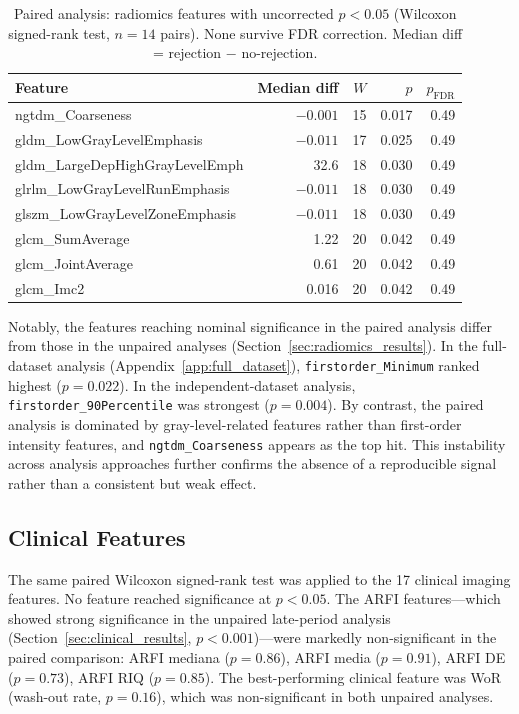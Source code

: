 \begin{table}[ht]
\centering
\caption{Paired analysis: radiomics features with uncorrected $p < 0.05$ (Wilcoxon signed-rank test, $n = 14$ pairs). None survive FDR correction. Median diff = rejection $-$ no-rejection.}
\label{tab:paired_radiomics}
\small
\begin{tabular}{lrrrr}
\toprule
Feature & Median diff & $W$ & $p$ & $p_{\text{FDR}}$ \\
\midrule
ngtdm\_Coarseness & $-0.001$ & 15 & 0.017 & 0.49 \\
gldm\_LowGrayLevelEmphasis & $-0.011$ & 17 & 0.025 & 0.49 \\
gldm\_LargeDepHighGrayLevelEmph & 32.6 & 18 & 0.030 & 0.49 \\
glrlm\_LowGrayLevelRunEmphasis & $-0.011$ & 18 & 0.030 & 0.49 \\
glszm\_LowGrayLevelZoneEmphasis & $-0.011$ & 18 & 0.030 & 0.49 \\
glcm\_SumAverage & 1.22 & 20 & 0.042 & 0.49 \\
glcm\_JointAverage & 0.61 & 20 & 0.042 & 0.49 \\
glcm\_Imc2 & 0.016 & 20 & 0.042 & 0.49 \\
\bottomrule
\end{tabular}
\end{table}

Notably, the features reaching nominal significance in the paired analysis differ from those in the unpaired analyses (Section~\ref{sec:radiomics_results}). In the full-dataset analysis (Appendix~\ref{app:full_dataset}), \texttt{firstorder\_Minimum} ranked highest ($p = 0.022$). In the independent-dataset analysis, \texttt{firstorder\_90Percentile} was strongest ($p = 0.004$). By contrast, the paired analysis is dominated by gray-level-related features rather than first-order intensity features, and \texttt{ngtdm\_Coarseness} appears as the top hit. This instability across analysis approaches further confirms the absence of a reproducible signal rather than a consistent but weak effect.

\subsection{Clinical Features}

The same paired Wilcoxon signed-rank test was applied to the 17 clinical imaging features. No feature reached significance at $p < 0.05$. The ARFI features---which showed strong significance in the unpaired late-period analysis (Section~\ref{sec:clinical_results}, $p < 0.001$)---were markedly non-significant in the paired comparison: ARFI mediana ($p = 0.86$), ARFI media ($p = 0.91$), ARFI DE ($p = 0.73$), ARFI RIQ ($p = 0.85$). The best-performing clinical feature was WoR (wash-out rate, $p = 0.16$), which was non-significant in both unpaired analyses.


